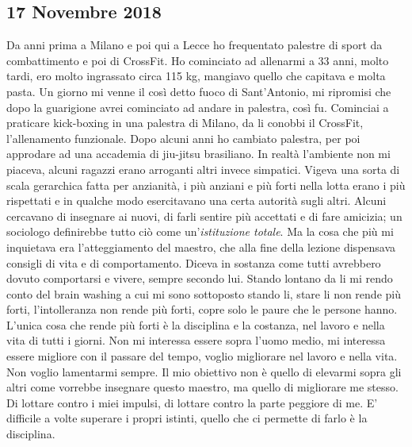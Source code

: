 \subsection{17 Novembre 2018}
Da anni prima a Milano e poi qui a Lecce ho frequentato palestre di sport da combattimento e poi di CrossFit. Ho cominciato ad allenarmi a 33 anni, molto tardi, ero molto ingrassato circa 115 kg, mangiavo quello che capitava e molta pasta. Un giorno mi venne il così detto fuoco di Sant'Antonio, mi ripromisi che dopo la guarigione avrei cominciato ad andare in palestra, così fu. Cominciai a praticare kick-boxing in una palestra di Milano, da li conobbi il CrossFit, l'allenamento funzionale. Dopo alcuni anni ho cambiato palestra, per poi approdare ad una accademia di jiu-jitsu brasiliano.
In realtà l'ambiente non mi piaceva, alcuni ragazzi erano arroganti altri invece simpatici. Vigeva una sorta di scala gerarchica fatta per anzianità, i più anziani e più forti nella lotta erano i più rispettati e in qualche modo esercitavano una certa autorità sugli altri. Alcuni cercavano di insegnare ai nuovi, di farli sentire più accettati e di fare amicizia; un sociologo definirebbe tutto ciò come un'\emph{istituzione totale}.\newline
Ma la cosa che più mi inquietava era l'atteggiamento del maestro, che alla fine della lezione dispensava consigli di vita e di comportamento. Diceva in sostanza come tutti avrebbero dovuto comportarsi e vivere, sempre secondo lui. Stando lontano da li mi rendo conto del brain washing a cui mi sono sottoposto stando li, stare li non rende  più forti, l'intolleranza non rende più forti, copre solo le paure che le persone hanno. L'unica cosa che rende più forti è la disciplina e la costanza, nel lavoro e nella vita di tutti i giorni.\newline
Non mi interessa essere sopra l'uomo medio, mi interessa essere migliore con il passare del tempo, voglio migliorare nel lavoro e nella vita. Non voglio lamentarmi sempre.\newline
Il mio obiettivo non è quello di elevarmi sopra gli altri come vorrebbe insegnare questo maestro, ma quello di migliorare me stesso. Di lottare contro i miei impulsi, di lottare contro la parte peggiore di me.
E' difficile a volte superare i propri istinti, quello che ci permette di farlo è la disciplina.